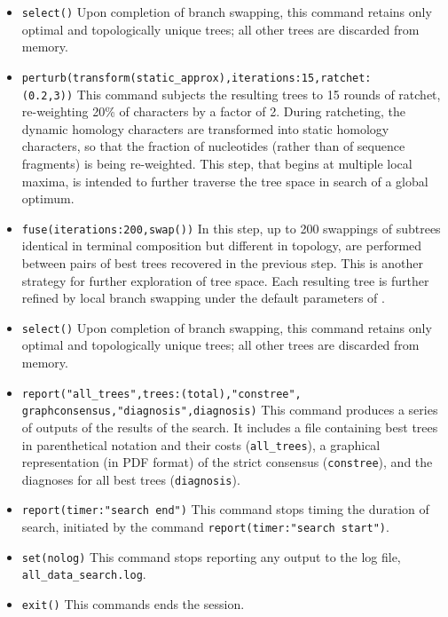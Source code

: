 \begin{itemize}
\item \texttt{select()} Upon completion of branch swapping, this command retains only optimal and topologically unique trees; all other trees are discarded from memory. 
\item \texttt{perturb(transform(static\_approx),iterations:15,ratchet:\\(0.2,3))} This command subjects the resulting trees to 15 rounds of ratchet, re-weighting 20\% of characters by a factor of 2. During ratcheting, the dynamic homology characters are transformed into static homology characters, so that the fraction of nucleotides (rather than of sequence fragments) is being re-weighted. This step, that begins at multiple local maxima, is intended to further traverse the tree space in search of a global optimum.
\item \texttt{fuse(iterations:200,swap())} In this step, up to 200 swappings of subtrees identical in terminal composition but different in topology, are performed between pairs of best trees recovered in the previous step. This is another strategy for further exploration of tree space. Each resulting tree is further refined by local branch swapping under the default parameters of .
\item \texttt{select()} Upon completion of branch swapping, this command retains only optimal and topologically unique trees; all other trees are discarded from memory.
\item \texttt{report("all\_trees",trees:(total),"constree",\\graphconsensus,"diagnosis",diagnosis)} This command produces a series of outputs of the results of the search. It includes a file containing best trees in parenthetical notation and their costs (\texttt{all\_trees}), a graphical representation (in PDF format) of the strict consensus (\texttt{constree}), and the diagnoses for all best trees (\texttt{diagnosis}).
\item \texttt{report(timer:"search end")} This command stops timing the duration of search, initiated by the command \texttt{report(timer:"search start")}.
\item \texttt{set(nolog)} This command stops reporting any output to the log file, \texttt{all\_data\_search.log}.
\item \texttt{exit()} This commands ends the \poy session.
\end{itemize}

